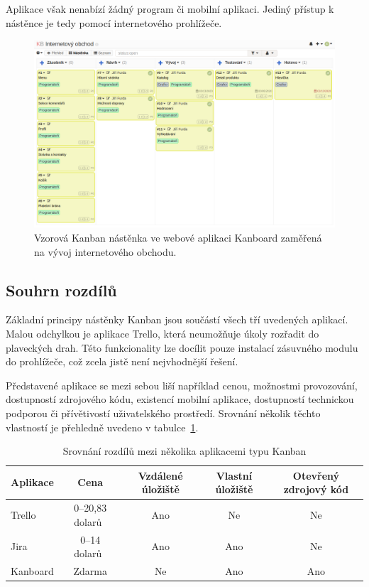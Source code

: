 Aplikace však nenabízí žádný program či mobilní aplikaci. Jediný přístup k nástěnce je tedy pomocí internetového prohlížeče.

\begin{figure}[H]
	\centering
	\includegraphics[width=\textwidth]{obrazky-figures/kanboard.png}
	\caption{Vzorová Kanban nástěnka ve webové aplikaci Kanboard zaměřená na vývoj internetového obchodu.}
\end{figure}

\subsection{Souhrn rozdílů}

Základní principy nástěnky Kanban jsou součástí všech tří uvedených aplikací. Malou odchylkou je aplikace Trello, která neumožňuje úkoly rozřadit do plaveckých drah. Této funkcionality lze docílit pouze instalací zásuvného modulu do prohlížeče, což zcela jistě není nejvhodnější řešení.

Představené aplikace se mezi sebou liší například cenou, možnostmi provozování, dostupností zdrojového kódu, existencí mobilní aplikace, dostupností technickou podporou či přívětivostí uživatelského prostředí. Srovnání několik těchto vlastností je přehledně uvedeno v tabulce~\ref{tab:kanban-sum}. 

\begin{table}[hbt]
\centering
\caption{Srovnání rozdílů mezi několika aplikacemi typu Kanban}
\label{tab:kanban-sum}
\begin{tabular}{ |l|c|c|c|c| } 
\hline
Aplikace & Cena\footnotemark & Vzdálené úložiště & Vlastní úložiště & Otevřený zdrojový kód  \\
\hline
Trello & 0--20,83 dolarů~\cite{bib:trello-pricing} & Ano & Ne & Ne \\ 
Jira & 0--14 dolarů~\cite{bib:jira-pricing} & Ano & Ano & Ne \\ 
Kanboard & Zdarma & Ne & Ano & Ano \\ 
\hline
\end{tabular}
\end{table}

